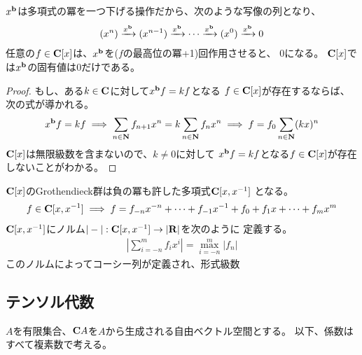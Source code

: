 	\begin{todo}[ここまで]\label{todo:ここまで} %
	\end{todo} %
	$x^{\mathbf{b}}$は多項式の冪を一つ下げる操作だから、次のような写像の列となり、
	\begin{equation*}\begin{split}
		(x^n) \xrightarrow[{}]{x^{\mathbf{b}}} (x^{n-1}) \xrightarrow[{}]{x^{\mathbf{b}}}\cdots\xrightarrow[{}]{x^{\mathbf{b}}} (x^0)
		\xrightarrow[{}]{x^{\mathbf{b}}} 0
	\end{split}\end{equation*}
	任意の$f\in\mathbf{C}[x]$は、$x^{\mathbf{b}}$を($f$の最高位の冪+1)回作用させると、
	$0$になる。
	$\mathbf{C}[x]$では$x^{\mathbf{b}}$の固有値は$0$だけである。
	\begin{proof} もし、ある$k\in\mathbf{C}$に対して$x^{\mathbf{b}} f=kf$となる
	$f\in\mathbf{C}[x]$が存在するならば、次の式が導かれる。
	\begin{equation*}\begin{split}
		x^{\mathbf{b}} f=kf
		\implies \sum_{n\in\mathbf{N}} f_{n+1}x^n = k\sum_{n\in\mathbf{N}}f_nx^n
		\implies f = f_0 \sum_{n\in\mathbf{N}}(kx)^n
	\end{split}\end{equation*}
	$\mathbf{C}[x]$は無限級数を含まないので、$k\neq0$に対して
	$x^{\mathbf{b}} f=kf$となる$f\in\mathbf{C}[x]$が存在しないことがわかる。
	\end{proof}
	$\mathbf{C}[x]$のGrothendieck群は負の冪も許した多項式$\mathbf{C}[x,x^{-1}]$
	となる。
	\begin{equation*}\begin{split}
		f\in\mathbf{C}[x,x^{-1}] \implies f = f_{-n}x^{-n} + \cdots + f_{-1}x^{-1} + f_0 + f_1x + \cdots + f_mx^m
	\end{split}\end{equation*}
	$\mathbf{C}[x,x^{-1}]$にノルム$|-|:\mathbf{C}[x,x^{-1}]\to|\mathbf{R}|$を次のように
	定義する。
	\begin{equation*}\begin{split}
		|\sum_{i=-n}^mf_ix^i| = \max_{i=-n}^m|f_n|
	\end{split}\end{equation*}
	このノルムによってコーシー列が定義され、形式級数
\subsection{テンソル代数}\label{s2:テンソル代数} %
	$A$を有限集合、$\mathbf{C} A$を$A$から生成される自由ベクトル空間とする。
	以下、係数はすべて複素数で考える。

